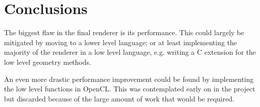 \section{Conclusions}
  The biggest flaw in the final renderer is its performance.  This could largely
  be mitigated by moving to a lower level language; or at least implementing the
  majority of the renderer in a low level language, e.g. writing a C extension
  for the low level geometry methods.

  An even more drastic performance improvement could be found by implementing
  the low level functions in OpenCL.  This was contemplated early on in the
  project but discarded because of the large amount of work that would be
  required.
